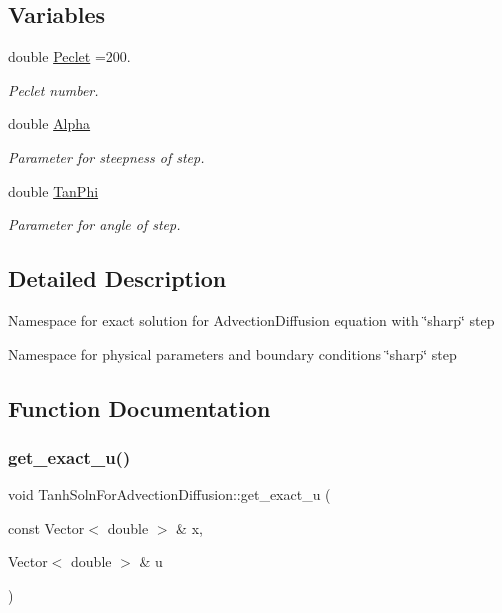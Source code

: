 \subsection*{Variables}
\begin{DoxyCompactItemize}
\item 
double \hyperlink{namespaceTanhSolnForAdvectionDiffusion_aeba486af70e92ab7eec1da3ce44d51ee}{Peclet} =200.
\begin{DoxyCompactList}\small\item\em Peclet number. \end{DoxyCompactList}\item 
double \hyperlink{namespaceTanhSolnForAdvectionDiffusion_a4d202e8ac48cc75f760ef40681402ec7}{Alpha}
\begin{DoxyCompactList}\small\item\em Parameter for steepness of step. \end{DoxyCompactList}\item 
double \hyperlink{namespaceTanhSolnForAdvectionDiffusion_a236bf82c661189623706b7c9d9b0c52f}{Tan\+Phi}
\begin{DoxyCompactList}\small\item\em Parameter for angle of step. \end{DoxyCompactList}\end{DoxyCompactItemize}


\subsection{Detailed Description}
Namespace for exact solution for Advection\+Diffusion equation with \char`\"{}sharp\char`\"{} step

Namespace for physical parameters and boundary conditions \char`\"{}sharp\char`\"{} step 

\subsection{Function Documentation}
\mbox{\label{namespaceTanhSolnForAdvectionDiffusion_ae4c9ed0a4f123ec8e634f0cc45bfcebc}} 
\subsubsection{\texorpdfstring{get\+\_\+exact\+\_\+u()}{get\_exact\_u()}\hspace{0.1cm}{\footnotesize\ttfamily [1/2]}}
{\footnotesize\ttfamily void Tanh\+Soln\+For\+Advection\+Diffusion\+::get\+\_\+exact\+\_\+u (\begin{DoxyParamCaption}\item[{const Vector$<$ double $>$ \&}]{x,  }\item[{Vector$<$ double $>$ \&}]{u }\end{DoxyParamCaption})}



